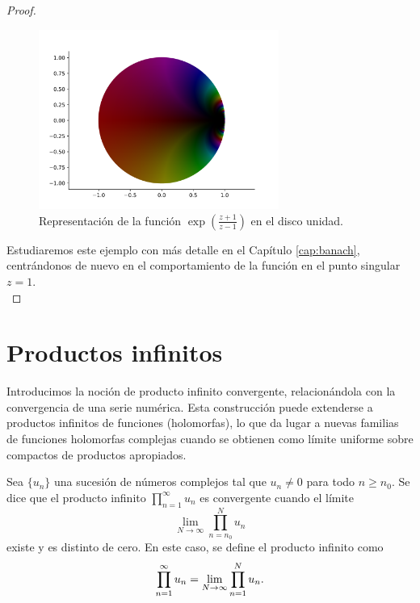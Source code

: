 \begin{proof}
\begin{figure}[!htbp]
    \centering
    \includegraphics[width=0.7\textwidth]{../Aplicacion/e^((z+1):(z-1)).png}
    \caption{Representación de la función $\exp{\left(\frac{z + 1}{z - 1}\right)}$ en el disco unidad.}
    \label{fig:ejemplo5}
\end{figure}

     Estudiaremos este ejemplo con más detalle en el Capítulo \ref{cap:banach}, centrándonos de nuevo en el comportamiento de la función en el punto singular $z = 1$. \\

\end{proof}

\section{Productos infinitos}

Introducimos la noción de producto infinito convergente, relacionándola con la convergencia de una serie numérica. Esta construcción puede extenderse a productos infinitos de funciones (holomorfas), lo que da lugar a nuevas familias de funciones holomorfas complejas cuando se obtienen como límite uniforme sobre compactos de productos apropiados. \\

\begin{definition}
    Sea $\{u_n\}$ una sucesión de números complejos tal que $u_n \neq 0$ para todo $n \geq n_0$. Se dice que el producto infinito $\prod_{n=1}^{\infty} u_n$ es convergente cuando el límite
    \begin{equation*}
        \lim_{N \to \infty} \prod_{n=n_0}^{N} u_n
    \end{equation*}
    existe y es distinto de cero. En este caso, se define el producto infinito como
    \begin{equation*}
        \prod_{n=1}^{\infty} u_n = \lim_{N \to \infty} \prod_{n=1}^{N} u_n. \\
    \end{equation*}
\end{definition}

